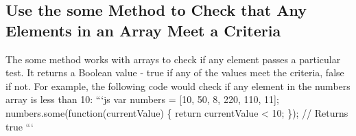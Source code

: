 \documentclass{article}%
\begin{document}
\subsection{Use the some Method to Check that Any Elements in an Array Meet a Criteria}%
\label{subsec:UsethesomeMethodtoCheckthatAnyElementsinanArrayMeetaCriteria}%
The some method works with arrays to check if any element passes a particular test. It returns a Boolean value {-} true if any of the values meet the criteria, false if not.\newline%
For example, the following code would check if any element in the numbers array is less than 10:\newline%
```js\newline%
var numbers = {[}10, 50, 8, 220, 110, 11{]};\newline%
numbers.some(function(currentValue) \{\newline%
  return currentValue < 10;\newline%
\});\newline%
// Returns true\newline%
```\newline%

%
\end{document}
